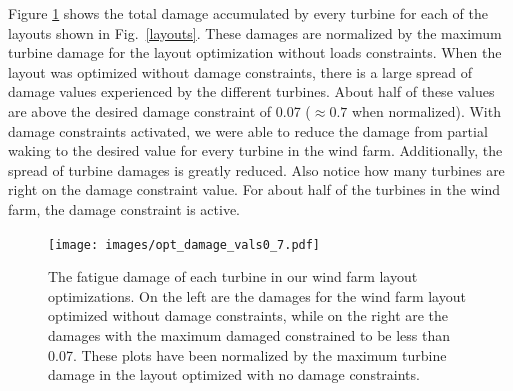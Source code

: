 \documentclass[11pt,letterpaper]{article}
\begin{document}
Figure \ref{opt_damages} shows the total damage accumulated by every turbine for each of the layouts shown in Fig.~\ref{layouts}. These damages are normalized by the maximum turbine damage for the layout optimization without loads constraints. 
When the layout was optimized without damage constraints, there is a large spread of damage values experienced by the different turbines. About half of these values are above the desired damage constraint of 0.07 ($\approx0.7$ when normalized). With damage constraints activated, we were able to reduce the damage from partial waking to the desired value for every turbine in the wind farm. Additionally, the spread of turbine damages is greatly reduced. Also notice how many turbines are right on the damage constraint value. For about half of the turbines in the wind farm, the damage constraint is active. 
% 
\begin{figure}
    \centering
    \texttt{[image: images/opt\_damage\_vals0\_7.pdf]}
    \caption{The fatigue damage of each turbine in our wind farm layout optimizations. On the left are the damages for the wind farm layout optimized without damage constraints, while on the right are the damages with the maximum damaged constrained to be less than 0.07. These plots have been normalized by the maximum turbine damage in the layout optimized with no damage constraints.}
    \label{opt_damages}
\end{figure}




\end{document}
